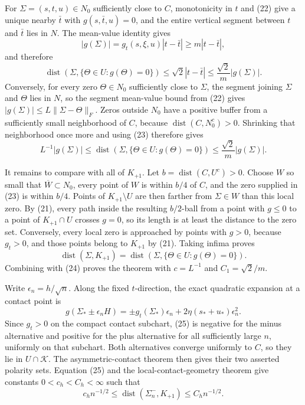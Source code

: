For \(\Sigma=(s,t,u)\in N_0\) sufficiently close to \(C\), monotonicity in \(t\) and (22) give a unique nearby \(\bar t\) with \(g(s,\bar t,u)=0\), and the entire vertical segment between \(t\) and \(\bar t\) lies in \(N\).  The mean-value identity gives
\[
 |g(\Sigma)|=g_t(s,\xi,u)|t-\bar t|\ge m|t-\bar t|,
\]
and therefore
\[
 \operatorname{dist}(\Sigma,\{\Theta\in U:g(\Theta)=0\})
 \le\sqrt2|t-\bar t|\le\frac{\sqrt2}{m}|g(\Sigma)|. \tag{23}
\]
Conversely, for every zero \(\Theta\in N_0\) sufficiently close to \(\Sigma\), the segment joining \(\Sigma\) and \(\Theta\) lies in \(N\), so the segment mean-value bound from (22) gives \(|g(\Sigma)|\le L\lVert\Sigma-\Theta\rVert_F\).  Zeros outside \(N_0\) have a positive buffer from a sufficiently small neighborhood of \(C\), because \(\operatorname{dist}(C,N_0^c)>0\).  Shrinking that neighborhood once more and using (23) therefore gives
\[
 L^{-1}|g(\Sigma)|
 \le\operatorname{dist}(\Sigma,\{\Theta\in U:g(\Theta)=0\})
 \le\frac{\sqrt2}{m}|g(\Sigma)|. \tag{24}
\]

It remains to compare with all of \(K_{+1}\).  Let \(b=\operatorname{dist}(C,U^c)>0\).  Choose \(W\) so small that \(\overline W\subset N_0\), every point of \(W\) is within \(b/4\) of \(C\), and the zero supplied in (23) is within \(b/4\).  Points of \(K_{+1}\setminus U\) are then farther from \(\Sigma\in W\) than this local zero.  By (21), every path inside the resulting \(b/2\)-ball from a point with \(g\le0\) to a point of \(K_{+1}\cap U\) crosses \(g=0\), so its length is at least the distance to the zero set.  Conversely, every local zero is approached by points with \(g>0\), because \(g_t>0\), and those points belong to \(K_{+1}\) by (21).  Taking infima proves
\[
 \operatorname{dist}(\Sigma,K_{+1})
 =\operatorname{dist}(\Sigma,\{\Theta\in U:g(\Theta)=0\}).
\]
Combining with (24) proves the theorem with \(c=L^{-1}\) and \(C_1=\sqrt2/m\).

Write \(\epsilon_n=h/\sqrt n\).  Along the fixed \(t\)-direction, the exact quadratic expansion at a contact point is
\[
 g(\Sigma_*\pm\epsilon_n H)
 =\pm g_t(\Sigma_*)\epsilon_n+2\eta(s_*+u_*)\epsilon_n^2. \tag{25}
\]
Since \(g_t>0\) on the compact contact subchart, (25) is negative for the minus alternative and positive for the plus alternative for all sufficiently large \(n\), uniformly on that subchart.  Both alternatives converge uniformly to \(C\), so they lie in \(U\cap\mathcal K\).  The asymmetric-contact theorem then gives their two asserted polarity sets.  Equation (25) and the local-contact-geometry theorem give constants \(0<c_h<C_h<\infty\) such that
\[
 c_hn^{-1/2}\le\operatorname{dist}(\Sigma_n^-,K_{+1})
 \le C_hn^{-1/2}. \tag{26}
\]

